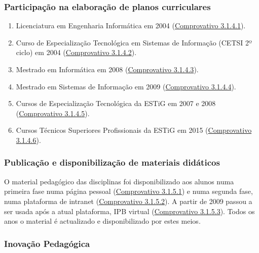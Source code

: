 \documentclass[11pt]{article}
\begin{document}
\subsubsection{Participação na elaboração de planos curriculares}
\begin{enumerate}
\item {Licenciatura em Engenharia Informática em 2004 (\href{run:MissaoIPBoutros/desenhoCursos.pdf}{Comprovativo 3.1.4.1}).}
\item {Curso de Especialização Tecnológica em Sistemas de Informação (CETSI 2º ciclo) em 2004 (\href{run:MissaoIPBoutros/desenhoCursos.pdf}{Comprovativo 3.1.4.2}).}
\item {Mestrado em Informática em 2008 (\href{run:MissaoIPBoutros/desenhoCursos.pdf}{Comprovativo 3.1.4.3}).}
\item {Mestrado em Sistemas de Informação em 2009 (\href{run:MissaoIPBoutros/desenhoCursos.pdf}{Comprovativo 3.1.4.4}).}
\item {Cursos de Especialização Tecnológica da ESTiG em 2007 e 2008 (\href{run:MissaoIPBCargos/tarefasSub.pdf}{Comprovativo 3.1.4.5}).}
\item {Cursos Técnicos Superiores Profissionais da ESTiG em 2015 (\href{run:MissaoIPBCargos/tarefasSub.pdf}{Comprovativo 3.1.4.6}).}
\end{enumerate}

\subsubsection{Publicação e disponibilização de materiais didáticos}
O material pedagógico das disciplinas foi disponibilizado aos alunos numa primeira fase numa página pessoal (\href{run:Virtual/usoPagPessoal.pdf}{Comprovativo 3.1.5.1}) e numa segunda fase, numa plataforma de intranet (\href{run:Virtual/intranet.pdf}{Comprovativo 3.1.5.2}). A partir de 2009 passou a ser usada após a atual plataforma, IPB virtual (\href{run:Virtual/usoIPBVirtual.pdf}{Comprovativo 3.1.5.3}).
Todos os anos o material é actualizado e disponibilizado por estes meios.


\subsubsection{Inovação Pedagógica}
\end{document}
